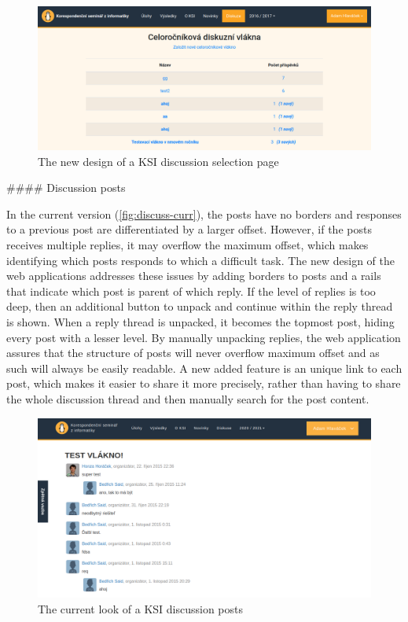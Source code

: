 \documentclass[
  digital, %
  oneside, %
  lof,     %
  lot,     %
]{fithesis4}
\begin{document}
{\begin{figure}
\includegraphics[width=\textwidth]{assets/img/discussionroot-new}
\caption{The new design of a KSI discussion selection page}
\label{fig:discussroot-new}
\end{figure}

#### Discussion posts

In the current version (\autoref{fig:discuss-curr}), the posts have no borders and responses to a previous post are differentiated by a larger offset. However, if the posts receives multiple replies, it may overflow the maximum offset, which makes identifying which posts responds to which a difficult task. The new design of the web applications addresses these issues by adding borders to posts and a rails that indicate which post is parent of which reply. If the level of replies is too deep, then an additional button to unpack and continue within the reply thread is shown. When a reply thread is unpacked, it becomes the topmost post, hiding every post with a lesser level. By manually unpacking replies, the web application assures that the structure of posts will never overflow maximum offset and as such will always be easily readable. A new added feature is an unique link to each post, which makes it easier to share it more precisely, rather than having to share the whole discussion thread and then manually search for the post content.

\begin{figure}
\includegraphics[width=\textwidth]{assets/img/discussion-curr}
\caption{The current look of a KSI discussion posts}
\label{fig:discuss-curr}
\end{figure}

}
\end{document}
